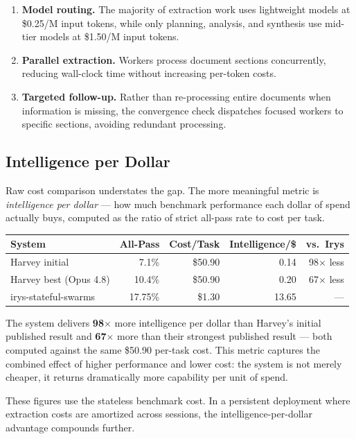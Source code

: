 \documentclass[11pt,a4paper]{article}
\begin{document}
\begin{enumerate}[leftmargin=2em]
\item \textbf{Model routing.} The majority of extraction work uses lightweight models at \$0.25/M input tokens, while only planning, analysis, and synthesis use mid-tier models at \$1.50/M input tokens.
\item \textbf{Parallel extraction.} Workers process document sections concurrently, reducing wall-clock time without increasing per-token costs.
\item \textbf{Targeted follow-up.} Rather than re-processing entire documents when information is missing, the convergence check dispatches focused workers to specific sections, avoiding redundant processing.
\end{enumerate}

\subsection{Intelligence per Dollar}

Raw cost comparison understates the gap. The more meaningful metric is \textit{intelligence per dollar} — how much benchmark performance each dollar of spend actually buys, computed as the ratio of strict all-pass rate to cost per task.

\begin{center}
\begin{tabular}{lrrrr}
\toprule
\textbf{System} & \textbf{All-Pass} & \textbf{Cost/Task} & \textbf{Intelligence/\$} & \textbf{vs.\ Irys} \\
\midrule
Harvey initial & 7.1\% & \$50.90 & 0.14 & 98$\times$ less \\
Harvey best (Opus 4.8) & 10.4\% & \$50.90 & 0.20 & 67$\times$ less \\
irys-stateful-swarms & 17.75\% & \$1.30 & 13.65 & --- \\
\bottomrule
\end{tabular}
\end{center}

\noindent The system delivers \textbf{98$\times$} more intelligence per dollar than Harvey's initial published result and \textbf{67$\times$} more than their strongest published result — both computed against the same \$50.90 per-task cost. This metric captures the combined effect of higher performance and lower cost: the system is not merely cheaper, it returns dramatically more capability per unit of spend.

These figures use the stateless benchmark cost. In a persistent deployment where extraction costs are amortized across sessions, the intelligence-per-dollar advantage compounds further.
\end{document}
